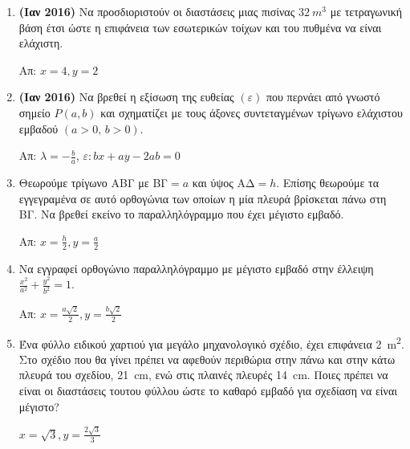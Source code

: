 



\everymath{\displaystyle}
\thispagestyle{empty}



\begin{center}
\end{center}

\vspace{\baselineskip}

\begin{enumerate}

	\item {\bfseries (Ιαν 2016)} Να προσδιοριστούν οι διαστάσεις μιας πισίνας $ \SI{32}{m^{3}} $ με
		τετραγωνική βάση έτσι ώστε η επιφάνεια των εσωτερικών τοίχων και του
		πυθμένα να είναι ελάχιστη. 

		\hfill Απ: $x=4, y=2$

	\item {\bfseries (Ιαν 2016)} Να βρεθεί η εξίσωση της ευθείας $ (\varepsilon)
		$ που περνάει από γνωστό σημείο $ P(a,b) $ και σχηματίζει με τους άξονες
		συντεταγμένων τρίγωνο ελάχιστου εμβαδού $ (a>0,\, b>0) $.

		\hfill Απ: $ \lambda = -\frac{b}{a} $, $\varepsilon: bx + ay - 2ab = 0$

	\item Θεωρούμε τρίγωνο ΑΒΓ με  ΒΓ$=a $ και ύψος ΑΔ$=h$. Επίσης θεωρούμε τα
		εγγεγραμένα σε αυτό ορθογώνια των οποίων η μία πλευρά βρίσκεται πάνω στη
		ΒΓ. Να βρεθεί εκείνο το παραλληλόγραμμο που έχει μέγιστο εμβαδό.
		
		\hfill Απ: $ x = \frac{h}{2}, y= \frac{a}{2} $

	\item Να εγγραφεί ορθογώνιο παραλληλόγραμμο με μέγιστο εμβαδό στην έλλειψη $
		\frac{x^{2}}{a^{2}} + \frac{y^{2}}{b^{2}} = 1 $. 

		\hfill Απ: $ x = \frac{a\sqrt{2}}{2}, y = \frac{b \sqrt{2}}{2} $

	\item Ένα φύλλο ειδικού χαρτιού για μεγάλο μηχανολογικό σχέδιο, έχει
		επιφάνεια \SI{2}{m^{2}}. Στο σχέδιο που θα γίνει πρέπει να αφεθούν
		περιθώρια στην πάνω και στην κάτω πλευρά του σχεδίου, \SI{21}{cm}, ενώ
		στις πλαινές πλευρές \SI{14}{cm}. Ποιες πρέπει να είναι οι διαστάσεις
		τουτου φύλλου ώστε το καθαρό εμβαδό για σχεδίαση να είναι μέγιστο?

		\hfill $ x = \sqrt{3}, y = \frac{2 \sqrt{3}}{3} $


\end{enumerate}
